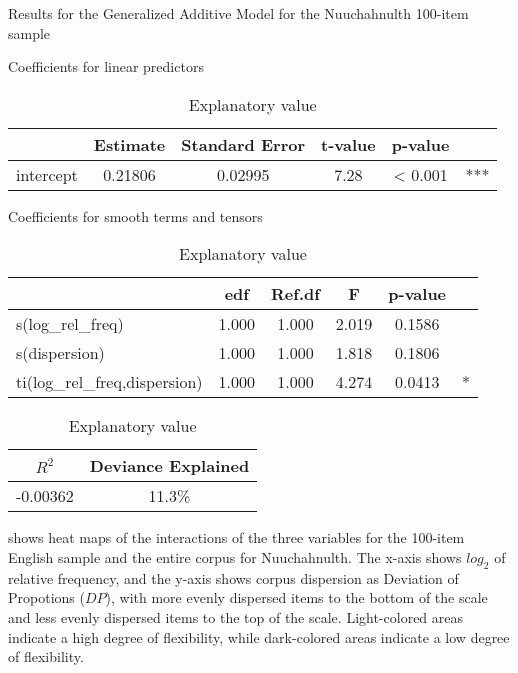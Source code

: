 \begin{table}[h!]

  \caption{Results for the Generalized Additive Model for the Nuuchahnulth 100-item sample}
  \label{tab:GAM-Nuu-100}

  \begin{subtable}[h]{\textwidth}
    \centering
    \caption{Coefficients for linear predictors}
    \begin{tabular}{ l c c c c c }
      {       } & Estimate & Standard Error & t-value & p-value & { }\\
      \midrule
      intercept & 0.21806  & 0.02995        & 7.28    & < 0.001 & ***\\
    \end{tabular}
  \end{subtable}

  \vspace{1em}

  \begin{subtable}[h]{\textwidth}
    \centering
    \caption{Coefficients for smooth terms and tensors}
    \begin{tabular}{ l c c c c c }
      { }                           & edf   & Ref.df & F     & p-value & { }\\
      \midrule
      s(log\_rel\_freq)             & 1.000 & 1.000  & 2.019 & 0.1586  & { }\\
      s(dispersion)                 & 1.000 & 1.000  & 1.818 & 0.1806  & { }\\
      ti(log\_rel\_freq,dispersion) & 1.000 & 1.000  & 4.274 & 0.0413  & *\\
    \end{tabular}
  \end{subtable}

  \vspace{1em}

  \begin{subtable}[h]{\textwidth}
    \centering
    \caption{Explanatory value}
    \begin{tabular}{ c c }
      $R^2$    & Deviance Explained\\
      \midrule
      -0.00362 & 11.3\%\\
    \end{tabular}
  \end{subtable}

\end{table}

 shows heat maps of the interactions of the three variables for the 100-item English sample and the entire corpus for Nuuchahnulth. The x-axis shows $log_2$ of relative frequency, and the y-axis shows corpus dispersion as Deviation of Propotions ($DP$), with more evenly dispersed items to the bottom of the scale and less evenly dispersed items to the top of the scale. Light-colored areas indicate a high degree of flexibility, while dark-colored areas indicate a low degree of flexibility.

